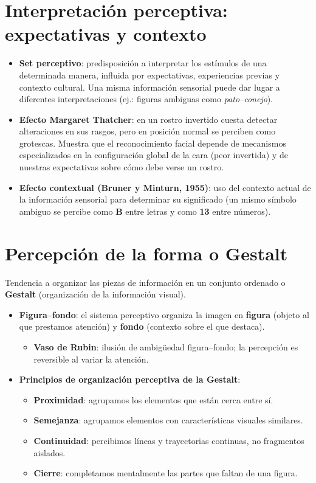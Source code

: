 \documentclass[11pt,a4paper]{article}
\begin{document}
\section{Interpretación perceptiva: expectativas y contexto}

\begin{itemize}
  \item \textbf{Set perceptivo}: predisposición a interpretar los estímulos de una determinada manera, influida por expectativas, experiencias previas y contexto cultural. Una misma información sensorial puede dar lugar a diferentes interpretaciones (ej.: figuras ambiguas como \emph{pato--conejo}).
  \item \textbf{Efecto Margaret Thatcher}: en un rostro invertido cuesta detectar alteraciones en sus rasgos, pero en posición normal se perciben como grotescas. Muestra que el reconocimiento facial depende de mecanismos especializados en la configuración global de la cara (peor invertida) y de nuestras expectativas sobre cómo debe verse un rostro.
  \item \textbf{Efecto contextual (Bruner y Minturn, 1955)}: uso del contexto actual de la información sensorial para determinar su significado (un mismo símbolo ambiguo se percibe como \textbf{B} entre letras y como \textbf{13} entre números).
\end{itemize}

\section{Percepción de la forma o Gestalt}

Tendencia a organizar las piezas de información en un conjunto ordenado o \textbf{Gestalt} (organización de la información visual).

\begin{itemize}
  \item \textbf{Figura--fondo}: el sistema perceptivo organiza la imagen en \textbf{figura} (objeto al que prestamos atención) y \textbf{fondo} (contexto sobre el que destaca).
  \begin{itemize}
    \item \textbf{Vaso de Rubin}: ilusión de ambigüedad figura--fondo; la percepción es reversible al variar la atención.
  \end{itemize}
  \item \textbf{Principios de organización perceptiva de la Gestalt}:
  \begin{itemize}
    \item \textbf{Proximidad}: agrupamos los elementos que están cerca entre sí.
    \item \textbf{Semejanza}: agrupamos elementos con características visuales similares.
    \item \textbf{Continuidad}: percibimos líneas y trayectorias continuas, no fragmentos aislados.
    \item \textbf{Cierre}: completamos mentalmente las partes que faltan de una figura.
  \end{itemize}
\end{itemize}
\end{document}
